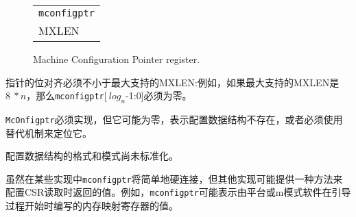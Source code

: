 {\begin{figure}[h!]
{\footnotesize
\begin{center}
\begin{tabular}{@{}J}
 \\
\hline
{} \\
\hline
MXLEN \\
\end{tabular}
\end{center}
}
\vspace{-0.1in}
\caption{Machine Configuration Pointer register.}
\label{mconfigptrreg}
\end{figure}

\iffalse
The pointer alignment in bits must be no smaller than the greatest supported
MXLEN: i.e., if the greatest supported MXLEN is $8\times n$, then
{\tt mconfigptr}[$\log_2n$-1:0] must be zero.

{\tt mconfigptr} must be implemented, but it may be zero to
indicate the configuration data structure does not exist or that an
alternative mechanism must be used to locate it.
\fi
指针的位对齐必须不小于最大支持的MXLEN:例如，如果最大支持的MXLEN是$8\ * n$，那么{\tt mconfigptr}[$\ log_n $-1:0]必须为零。

{\tt McOnfigptr}必须实现，但它可能为零，表示配置数据结构不存在，或者必须使用替代机制来定位它。

\iffalse
\begin{commentary}
The format and schema of the configuration data structure have yet to be standardized.
\end{commentary}
\fi
\begin{commentary}
配置数据结构的格式和模式尚未标准化。
\end{commentary}

\iffalse
\begin{commentary}
While {\tt mconfigptr} will simply be hardwired in some implementations, other
implementations may provide a means to configure the value returned on CSR
reads.
For example, {\tt mconfigptr} might present the value of a memory-mapped
register that is programmed by the platform or by M-mode software towards the
beginning of the boot process.
\end{commentary}
\fi
\begin{commentary}
虽然在某些实现中{\tt mconfigptr}将简单地硬连接，但其他实现可能提供一种方法来配置CSR读取时返回的值。例如，{\tt mconfigptr}可能表示由平台或m模式软件在引导过程开始时编写的内存映射寄存器的值。
\end{commentary}

}
